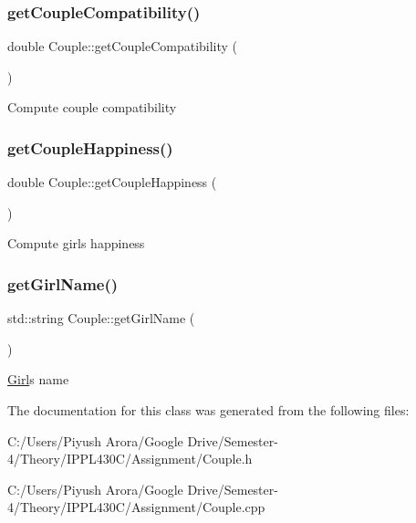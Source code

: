 \subsubsection{\texorpdfstring{get\+Couple\+Compatibility()}{getCoupleCompatibility()}}
{\footnotesize\ttfamily double Couple\+::get\+Couple\+Compatibility (\begin{DoxyParamCaption}{ }\end{DoxyParamCaption})}

Compute couple compatibility \mbox{\label{class_couple_a8a93de9d5d49ef45761ed98e89628a48}} 
\subsubsection{\texorpdfstring{get\+Couple\+Happiness()}{getCoupleHappiness()}}
{\footnotesize\ttfamily double Couple\+::get\+Couple\+Happiness (\begin{DoxyParamCaption}{ }\end{DoxyParamCaption})}

Compute girl\textquotesingle{}s happiness \mbox{\label{class_couple_a6a90d0e4ce7652962ba9bbf41f7a1392}} 
\subsubsection{\texorpdfstring{get\+Girl\+Name()}{getGirlName()}}
{\footnotesize\ttfamily std\+::string Couple\+::get\+Girl\+Name (\begin{DoxyParamCaption}{ }\end{DoxyParamCaption})}

\hyperlink{class_girl}{Girl}\textquotesingle{}s name 

The documentation for this class was generated from the following files\+:\begin{DoxyCompactItemize}
\item 
C\+:/\+Users/\+Piyush Arora/\+Google Drive/\+Semester-\/4/\+Theory/\+I\+P\+P\+L430\+C/\+Assignment/Couple.\+h\item 
C\+:/\+Users/\+Piyush Arora/\+Google Drive/\+Semester-\/4/\+Theory/\+I\+P\+P\+L430\+C/\+Assignment/Couple.\+cpp\end{DoxyCompactItemize}
